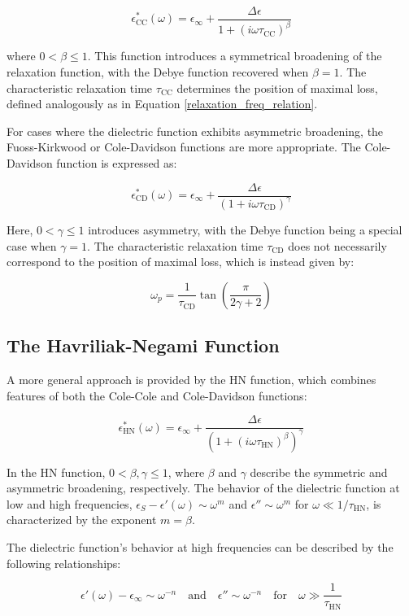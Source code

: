 \[
\epsilon^*_{\text{CC}}(\omega) = \epsilon_\infty + \frac{\Delta \epsilon}{1 + (i \omega \tau_{\text{CC}})^\beta}
\]

where \( 0 < \beta \leq 1 \). This function introduces a symmetrical broadening of the relaxation function, with the Debye function recovered when \( \beta = 1 \). The characteristic relaxation time \( \tau_{\text{CC}} \) determines the position of maximal loss, defined analogously as in Equation \ref{relaxation_freq_relation}.



For cases where the dielectric function exhibits asymmetric broadening, the Fuoss-Kirkwood or Cole-Davidson functions are more appropriate. The Cole-Davidson function is expressed as:

\[
\epsilon^*_{\text{CD}}(\omega) = \epsilon_\infty + \frac{\Delta \epsilon}{(1 + i \omega \tau_{\text{CD}})^\gamma}
\]

Here, \( 0 < \gamma \leq 1 \) introduces asymmetry, with the Debye function being a special case when \( \gamma = 1 \). The characteristic relaxation time \( \tau_{\text{CD}} \) does not necessarily correspond to the position of maximal loss, which is instead given by:

\[
\omega_p = \frac{1}{\tau_{\text{CD}}} \tan\left(\frac{\pi}{2\gamma + 2}\right)
\]

\subsection{The Havriliak-Negami Function}
A more general approach is provided by the \ac{HN} function, which combines features of both the Cole-Cole and Cole-Davidson functions:

\[
\epsilon^*_{\text{HN}}(\omega) = \epsilon_\infty + \frac{\Delta \epsilon}{(1 + (i \omega \tau_{\text{HN}})^\beta)^\gamma}
\]

In the HN function, \( 0 < \beta, \gamma \leq 1 \), where \( \beta \) and \( \gamma \) describe the symmetric and asymmetric broadening, respectively. The behavior of the dielectric function at low and high frequencies, \( \epsilon_S - \epsilon'(\omega) \sim \omega^m \) and \( \epsilon'' \sim \omega^m \) for \( \omega \ll 1/\tau_{\text{HN}} \), is characterized by the exponent \( m = \beta \).


The dielectric function's behavior at high frequencies can be described by the following relationships:

\[
\epsilon'(\omega) - \epsilon_\infty \sim \omega^{-n} \quad \text{and} \quad \epsilon'' \sim \omega^{-n} \quad \text{for} \quad \omega \gg \frac{1}{\tau_{\text{HN}}}
\]

